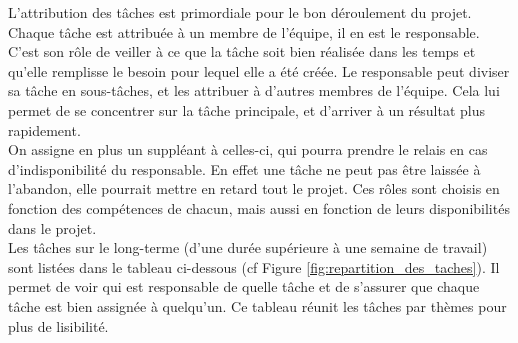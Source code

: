

L'attribution des t\^aches est primordiale pour le bon déroulement du projet. 
Chaque t\^ache est attribuée à un membre de l'équipe, il en est le responsable.
C'est son rôle de veiller à ce que la tâche soit bien réalisée dans les temps et qu'elle remplisse le besoin pour lequel elle a été créée.
Le responsable peut diviser sa tâche en sous-tâches, et les attribuer à d'autres membres de l'équipe.
Cela lui permet de se concentrer sur la tâche principale, et d'arriver à un résultat plus rapidement.
\\

On assigne en plus un suppl\'eant à celles-ci, qui pourra prendre le relais en cas d'indisponibilité du responsable. 
En effet une tâche ne peut pas être laissée à l'abandon, elle pourrait mettre en retard tout le projet.
Ces rôles sont choisis en fonction des compétences de chacun, mais aussi en fonction de leurs disponibilités dans le projet.
\\

Les tâches sur le long-terme (d'une durée supérieure à une semaine de travail)
sont list\'ees dans le tableau ci-dessous (cf Figure \ref*{fig:repartition_des_taches}).
Il permet de voir qui est responsable de quelle tâche et de s'assurer que chaque tâche est bien assign\'ee à quelqu'un.
Ce tableau r\'eunit les t\^aches par th\`emes pour plus de lisibilit\'e.


